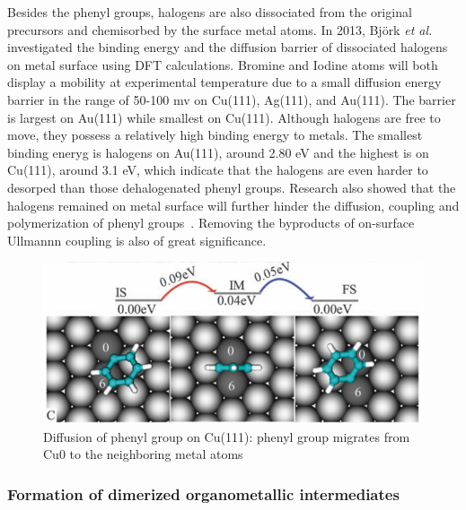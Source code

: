 \documentclass[%
 reprint,
 amsmath,amssymb,
 aps,
prb,
]{revtex4-2}
\begin{document}
Besides the phenyl groups, halogens are also dissociated from the original precursors and chemisorbed by the surface metal atoms. In 2013, Björk \textit{et al.}~\cite{jacs2013} investigated the binding energy and the diffusion barrier of dissociated halogens on metal surface using DFT calculations. Bromine and Iodine atoms will both display a mobility at experimental temperature due to a small diffusion energy barrier in the range of 50-100 mv on Cu(111), Ag(111), and Au(111). The barrier is largest on Au(111) while smallest on Cu(111). Although halogens are free to move, they possess a relatively high binding energy to metals. The smallest binding eneryg is halogens on Au(111), around 2.80 eV and the highest is on Cu(111), around 3.1 eV, which indicate that the halogens are even harder to desorped than those dehalogenated phenyl groups. Research also showed that the halogens remained on metal surface will further hinder the diffusion, coupling and polymerization of phenyl groups~\cite{ullmann_64,ullmann_65}. Removing the byproducts of on-surface Ullmannn coupling is also of great significance.

\begin{figure}[htb]
\centering
\includegraphics[width=0.75\columnwidth]{Fig/overturn.png}
\caption{Diffusion of phenyl group on Cu(111): phenyl group migrates from Cu0 to the neighboring metal atoms} %
\label{fig:4}
\end{figure}



\subsubsection{Formation of dimerized organometallic intermediates}
\end{document}
